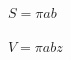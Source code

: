 \documentclass{article}
\begin{document}
$ S = \pi a b $
\pagebreak

$ V = \pi a b z $
\pagebreak
\end{document}
